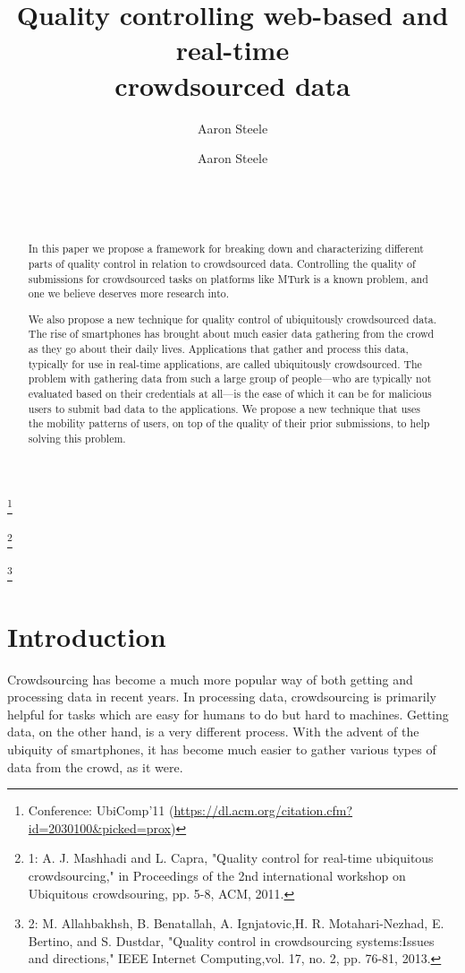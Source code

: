 \documentclass{sig-alternate-05-2015}
\title{Quality controlling web-based and real-time\\crowdsourced data}
\author{Aaron Steele}
\date{}
\author{
	\alignauthor
	Aaron Steele\\
	\affaddr{Jack Baskin School of Engineering}\\
	\affaddr{University of California Santa Cruz}\\
	\affaddr{Santa Cruz, CA}\\
	\email{atsteele@ucsc.edu}
}
\newcommand\blfootnote[1]{%
	\begingroup
	\renewcommand\thefootnote{}\footnote{#1}
	\addtocounter{footnote}{-1}
	\endgroup
}
\begin{document}
	\maketitle
	
	\blfootnote{Conference: UbiComp'11 (\url{https://dl.acm.org/citation.cfm?id=2030100&picked=prox}) }
	\blfootnote{1: A. J. Mashhadi and L. Capra, "Quality control for real-time ubiquitous crowdsourcing," in Proceedings of the 2nd international workshop on Ubiquitous crowdsouring, pp. 5-8, ACM, 2011.}
	\blfootnote{2: M. Allahbakhsh, B. Benatallah, A. Ignjatovic,H. R. Motahari-Nezhad, E. Bertino, and S. Dustdar, "Quality control in crowdsourcing systems:Issues and directions," IEEE Internet Computing,vol. 17, no. 2, pp. 76-81, 2013.}
	
	\begin{abstract}

	In this paper we propose a framework for breaking down and characterizing different parts of quality control in relation to crowdsourced data. Controlling the quality of submissions for crowdsourced tasks on platforms like MTurk is a known problem, and one we believe deserves more research into.
	
	We also propose a new technique for quality control of ubiquitously crowdsourced data. The rise of smartphones has brought about much easier data gathering from the crowd as they go about their daily lives. Applications that gather and process this data, typically for use in real-time applications, are called ubiquitously crowdsourced. The problem with gathering data from such a large group of people---who are typically not evaluated based on their credentials at all---is the ease of which it can be for malicious users to submit bad data to the applications. We propose a new technique that uses the mobility patterns of users, on top of the quality of their prior submissions, to help solving this problem.
	
	\end{abstract}
	
	\section{Introduction}
	
	Crowdsourcing has become a much more popular way of both getting and processing data in recent years. In processing data, crowdsourcing is primarily helpful for tasks which are easy for humans to do but hard to machines. \cite{burke2006participatory}
	Getting data, on the other hand, is a very different process. With the advent of the ubiquity of smartphones, it has become much easier to gather various types of data from the crowd, as it were.
	
\end{document}
